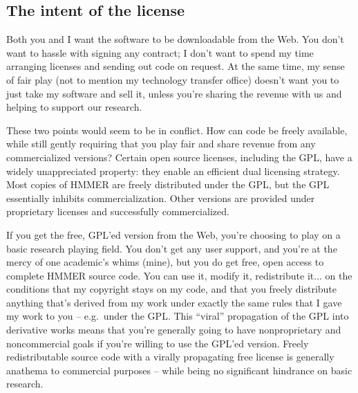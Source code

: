 \subsection{The intent of the license}

Both you and I want the software to be downloadable from the Web. You
don't want to hassle with signing any contract; I don't want to spend
my time arranging licenses and sending out code on request. At the
same time, my sense of fair play (not to mention my technology
transfer office) doesn't want you to just take my software and sell
it, unless you're sharing the revenue with us and helping to support
our research.

These two points would seem to be in conflict. How can code be freely
available, while still gently requiring that you play fair and share
revenue from any commercialized versions? Certain open source
licenses, including the GPL, have a widely unappreciated property:
they enable an efficient dual licensing strategy. Most copies of HMMER
are freely distributed under the GPL, but the GPL essentially inhibits
commercialization. Other versions are provided under proprietary
licenses and successfully commercialized. 

If you get the free, GPL'ed version from the Web, you're choosing to
play on a basic research playing field. You don't get any user
support, and you're at the mercy of one academic's whims (mine), but
you do get free, open access to complete HMMER source code.  You can
use it, modify it, redistribute it... on the conditions that my
copyright stays on my code, and that you freely distribute anything
that's derived from my work under exactly the same rules that I gave
my work to you -- e.g.\, under the GPL. This ``viral'' propagation of
the GPL into derivative works means that you're generally going to
have nonproprietary and noncommercial goals if you're willing to use
the GPL'ed version. Freely redistributable source code with a virally
propagating free license is generally anathema to commercial purposes
-- while being no significant hindrance on basic research.

